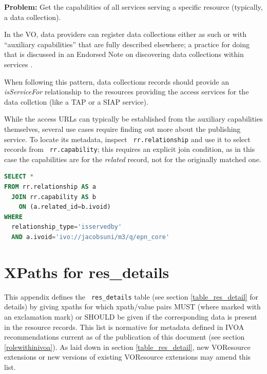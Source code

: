 \documentclass[11pt,a4paper]{ivoa}
\newcommand{\rtent}[1]{\texttt{\color{rtcolor} #1}}
\begin{document}
\textbf{Problem:} Get the capabilities of all services serving a
specific resource (typically, a data collection).

In the VO, data providers can register data collections either as such
or with ``auxiliary capabilities'' that are fully described elsewhere; a
practice for doing that is discussed in an Endorsed Note on discovering
data collections within services \citep{TODO}.

When following this pattern, data collections records should provide an
\emph{isServiceFor} relationship to the resources providing the access
services for the data collction (like a TAP or a SIAP service).

While the access URLs can typically be established from the auxiliary
capabilities themselves, several use cases require finding out more
about the publishing service.  To locate its metadata, inspect
\rtent{rr.relationship} and use it to select records
from 
\rtent{rr.capability}; this requires an explicit join condition, as in
this case the capabilities are for the \emph{related} record, not for
the originally matched one.

\begin{lstlisting}[language=SQL,flexiblecolumns=true]
SELECT * 
FROM rr.relationship AS a
  JOIN rr.capability AS b 
    ON (a.related_id=b.ivoid) 
WHERE 
  relationship_type='isservedby'
  AND a.ivoid='ivo://jacobsuni/m3/q/epn_core'
\end{lstlisting}




\appendix

\section{XPaths for res\_details}

\label{d_u_list}

This appendix defines the \rtent{res\_details}
table (see section \ref{table_res_detail} for
details) by giving
xpaths for which xpath/value pairs MUST (where marked with an
exclamation mark) or SHOULD be given if the
corresponding data is present in the resource records.  This list is
normative for metadata defined in IVOA recommendations current as of the
publication of this document (see section \ref{rolewithinivoa}).  
As laid down in section \ref{table_res_detail}, 
new VOResource extensions or new
versions of existing VOResource extensions may amend this list.
\end{document}
